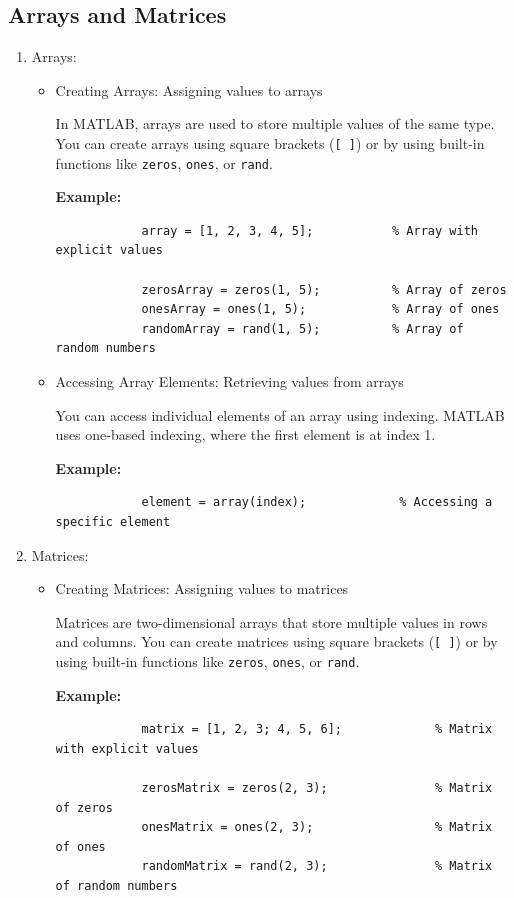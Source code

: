 \documentclass[
11pt, %
a4paper, %
oneside, %
headinclude,footinclude, %
BCOR5mm, %
]{scrartcl}
\begin{document}
\subsection{Arrays and Matrices}
\begin{enumerate}
	\item Arrays:
	\begin{itemize}
		\item Creating Arrays: Assigning values to arrays
		
		In MATLAB, arrays are used to store multiple values of the same type. You can create arrays using square brackets (\texttt{[ ]}) or by using built-in functions like \texttt{zeros}, \texttt{ones}, or \texttt{rand}.
		
		\textbf{Example:}
		\begin{verbatim}
			array = [1, 2, 3, 4, 5];           % Array with explicit values
			
			zerosArray = zeros(1, 5);          % Array of zeros
			onesArray = ones(1, 5);            % Array of ones
			randomArray = rand(1, 5);          % Array of random numbers
		\end{verbatim}
		
		\item Accessing Array Elements: Retrieving values from arrays
		
		You can access individual elements of an array using indexing. MATLAB uses one-based indexing, where the first element is at index 1.
		
		\textbf{Example:}
		\begin{verbatim}
			element = array(index);             % Accessing a specific element
		\end{verbatim}
	\end{itemize}
	
	\item Matrices:
	\begin{itemize}
		\item Creating Matrices: Assigning values to matrices
		
		Matrices are two-dimensional arrays that store multiple values in rows and columns. You can create matrices using square brackets (\texttt{[ ]}) or by using built-in functions like \texttt{zeros}, \texttt{ones}, or \texttt{rand}.
		
		\textbf{Example:}
		\begin{verbatim}
			matrix = [1, 2, 3; 4, 5, 6];             % Matrix with explicit values
			
			zerosMatrix = zeros(2, 3);               % Matrix of zeros
			onesMatrix = ones(2, 3);                 % Matrix of ones
			randomMatrix = rand(2, 3);               % Matrix of random numbers
		\end{verbatim}
		

\end{itemize}
\end{enumerate}
\end{document}
